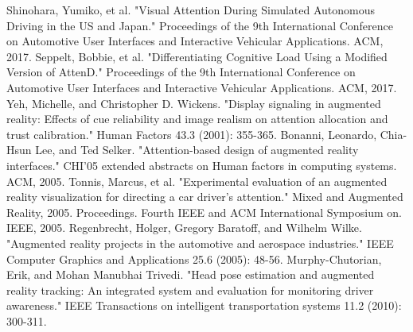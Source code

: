 \documentclass[a4paper, 11pt]{article}
\begin{document}
\begin{thebibliography}{9}
 Shinohara, Yumiko, et al. "Visual Attention During Simulated Autonomous Driving in the US and Japan." Proceedings of the 9th International Conference on Automotive User Interfaces and Interactive Vehicular Applications. ACM, 2017.
 Seppelt, Bobbie, et al. "Differentiating Cognitive Load Using a Modified Version of AttenD." Proceedings of the 9th International Conference on Automotive User Interfaces and Interactive Vehicular Applications. ACM, 2017.
 Yeh, Michelle, and Christopher D. Wickens. "Display signaling in augmented reality: Effects of cue reliability and image realism on attention allocation and trust calibration." Human Factors 43.3 (2001): 355-365.
 Bonanni, Leonardo, Chia-Hsun Lee, and Ted Selker. "Attention-based design of augmented reality interfaces." CHI'05 extended abstracts on Human factors in computing systems. ACM, 2005.
 Tonnis, Marcus, et al. "Experimental evaluation of an augmented reality visualization for directing a car driver's attention." Mixed and Augmented Reality, 2005. Proceedings. Fourth IEEE and ACM International Symposium on. IEEE, 2005.
 Regenbrecht, Holger, Gregory Baratoff, and Wilhelm Wilke. "Augmented reality projects in the automotive and aerospace industries." IEEE Computer Graphics and Applications 25.6 (2005): 48-56.
 Murphy-Chutorian, Erik, and Mohan Manubhai Trivedi. "Head pose estimation and augmented reality tracking: An integrated system and evaluation for monitoring driver awareness." IEEE Transactions on intelligent transportation systems 11.2 (2010): 300-311.
\end{thebibliography}
\end{document}

